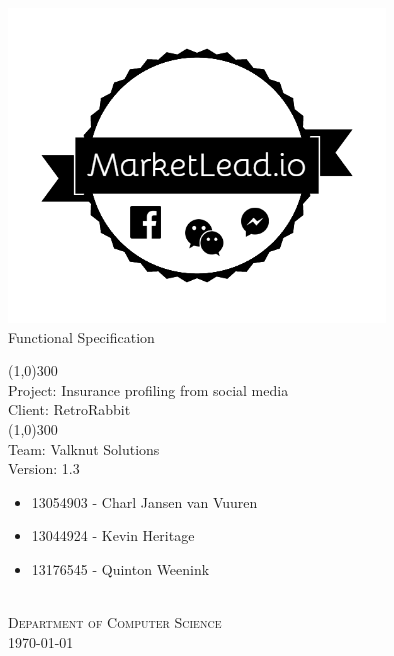 \documentclass{article}
\begin{document}
	\begin{titlepage}
		\begin{center}
			\includegraphics[width=10cm]{images/marketlead_3.png}  \\
			[0.5cm]
			\huge{
			Functional Specification\\
			}

			\line(1,0){300}\\
			[0.2cm]
			\LARGE{Project: Insurance profiling from social media\\
			Client: RetroRabbit} \\
			\line(1,0){300}\\
			\LARGE{Team: Valknut Solutions}\\
			[1.0cm]
			\large{Version: 1.3}\\
			\large
			{
			\begin{itemize}
				\item 13054903 - Charl Jansen van Vuuren
				\item 13044924 - Kevin Heritage
				\item 13176545 - Quinton Weenink\\
			\end{itemize}
			}
			\textsc{\large}\\
		[1.0cm]
		\textsc{\large  Department of Computer Science}\\
		[0.5cm]
		\textsc{\large \today}\\
		\end{center}


	\end{titlepage}
	\cleardoublepage
	\tableofcontents
	\cleardoublepage
	\begin{versionhistory}
	\end{versionhistory}
	
\end{document}
